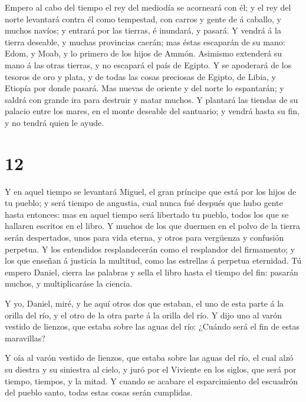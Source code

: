  Empero al cabo del tiempo el rey del mediodía se acorneará
con él; y el rey del norte levantará contra él como tempestad, con
carros y gente de á caballo, y muchos navíos; y entrará por las tierras,
é inundará, y pasará.  Y vendrá á la tierra deseable, y
muchas provincias caerán; mas éstas escaparán de su mano: Edom, y Moab,
y lo primero de los hijos de Ammón.  Asimismo extenderá su
mano á las otras tierras, y no escapará el país de Egipto. 
Y se apoderará de los tesoros de oro y plata, y de todas las cosas
preciosas de Egipto, de Libia, y Etiopía por donde pasará. 
Mas nuevas de oriente y del norte lo espantarán; y saldrá con grande ira
para destruir y matar muchos.  Y plantará las tiendas de su
palacio entre los mares, en el monte deseable del santuario; y vendrá
hasta su fin, y no tendrá quien le ayude.

\hypertarget{section-11}{%
\section{12}\label{section-11}}

 Y en aquel tiempo se levantará Miguel, el gran príncipe que
está por los hijos de tu pueblo; y será tiempo de angustia, cual nunca
fué después que hubo gente hasta entonces: mas en aquel tiempo será
libertado tu pueblo, todos los que se hallaren escritos en el libro.
 Y muchos de los que duermen en el polvo de la tierra serán
despertados, unos para vida eterna, y otros para vergüenza y confusión
perpetua.  Y los entendidos resplandecerán como el
resplandor del firmamento; y los que enseñan á justicia la multitud,
como las estrellas á perpetua eternidad.  Tú empero Daniel,
cierra las palabras y sella el libro hasta el tiempo del fin: pasarán
muchos, y multiplicaráse la ciencia.

 Y yo, Daniel, miré, y he aquí otros dos que estaban, el uno
de esta parte á la orilla del río, y el otro de la otra parte á la
orilla del río.  Y dijo uno al varón vestido de lienzos, que
estaba sobre las aguas del río: ¿Cuándo será el fin de estas maravillas?

 Y oía al varón vestido de lienzos, que estaba sobre las
aguas del río, el cual alzó su diestra y su siniestra al cielo, y juró
por el Viviente en los siglos, que será por tiempo, tiempos, y la mitad.
Y cuando se acabare el esparcimiento del escuadrón del pueblo santo,
todas estas cosas serán cumplidas.


